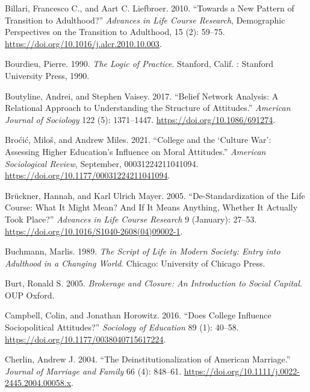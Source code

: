 \documentclass[
  12pt,
]{article}
\newlength{\cslhangindent}
\newlength{\cslentryspacingunit} %
\newenvironment{CSLReferences}[2] %
 {%
  \setlength{\parindent}{0pt}
  \ifodd #1
  \let\oldpar\par
  \def\par{\hangindent=\cslhangindent\oldpar}
  \fi
  \setlength{\parskip}{#2\cslentryspacingunit}
 }%
 {}
\begin{document}
\begin{CSLReferences}{1}{0}
\leavevmode{}%
Billari, Francesco C., and Aart C. Liefbroer. 2010. {``Towards a New Pattern of Transition to Adulthood?''} \emph{Advances in Life Course Research}, Demographic {Perspectives} on the {Transition} to {Adulthood}, 15 (2): 59--75. \url{https://doi.org/10.1016/j.alcr.2010.10.003}.

\leavevmode{}%
Bourdieu, Pierre. 1990. \emph{The Logic of Practice}. Stanford, Calif. : Stanford University Press, 1990.

\leavevmode{}%
Boutyline, Andrei, and Stephen Vaisey. 2017. {``Belief {Network} {Analysis}: {A} {Relational} {Approach} to {Understanding} the {Structure} of {Attitudes}.''} \emph{American Journal of Sociology} 122 (5): 1371--1447. \url{https://doi.org/10.1086/691274}.

\leavevmode{}%
Broćić, Miloš, and Andrew Miles. 2021. {``College and the {`{Culture} {War}'}: {Assessing} {Higher} {Education}'s {Influence} on {Moral} {Attitudes}.''} \emph{American Sociological Review}, September, 00031224211041094. \url{https://doi.org/10.1177/00031224211041094}.

\leavevmode{}%
Brückner, Hannah, and Karl Ulrich Mayer. 2005. {``De-{Standardization} of the {Life} {Course}: {What} It {Might} {Mean}? {And} If It {Means} {Anything}, {Whether} It {Actually} {Took} {Place}?''} \emph{Advances in Life Course Research} 9 (January): 27--53. \url{https://doi.org/10.1016/S1040-2608(04)09002-1}.

\leavevmode{}%
Buchmann, Marlis. 1989. \emph{The Script of Life in Modern Society: Entry into Adulthood in a Changing World}. Chicago: University of Chicago Press.

\leavevmode{}%
Burt, Ronald S. 2005. \emph{Brokerage and {Closure}: {An} {Introduction} to {Social} {Capital}}. OUP Oxford.

\leavevmode{}%
Campbell, Colin, and Jonathan Horowitz. 2016. {``Does {College} {Influence} {Sociopolitical} {Attitudes}?''} \emph{Sociology of Education} 89 (1): 40--58. \url{https://doi.org/10.1177/0038040715617224}.

\leavevmode{}%
Cherlin, Andrew J. 2004. {``The Deinstitutionalization of {American} Marriage.''} \emph{Journal of Marriage and Family} 66 (4): 848--61. \url{https://doi.org/10.1111/j.0022-2445.2004.00058.x}.


\end{CSLReferences}
\end{document}
